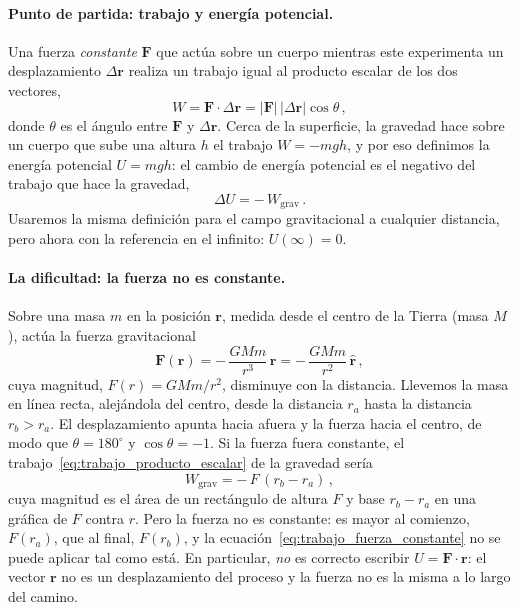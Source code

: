 \documentclass[11pt,a4paper]{book}
\begin{document}
\paragraph{Punto de partida: trabajo y energía potencial.}
Una fuerza \emph{constante} $\boldsymbol{F}$ que actúa sobre un cuerpo mientras
este experimenta un desplazamiento $\Delta\boldsymbol{r}$ realiza un trabajo
igual al producto escalar de los dos vectores,
\begin{equation}
  W = \boldsymbol{F}\cdot\Delta\boldsymbol{r}
    = \lvert\boldsymbol{F}\rvert\,\lvert\Delta\boldsymbol{r}\rvert\cos\theta \,,
  \label{eq:trabajo_producto_escalar}
\end{equation}
donde $\theta$ es el ángulo entre $\boldsymbol{F}$ y $\Delta\boldsymbol{r}$.
Cerca de la superficie, la gravedad hace sobre un cuerpo que sube una altura
$h$ el trabajo $W = -mgh$, y por eso definimos la energía potencial
$U = mgh$: el cambio de energía potencial es el negativo del trabajo que hace
la gravedad,
\begin{equation}
  \Delta U = -\,W_{\text{grav}} \,.
  \label{eq:def_cambio_epot}
\end{equation}
Usaremos la misma definición para el campo gravitacional a cualquier
distancia, pero ahora con la referencia en el infinito: $U(\infty) = 0$.

\paragraph{La dificultad: la fuerza no es constante.}
Sobre una masa $m$ en la posición $\boldsymbol{r}$, medida desde el centro de
la Tierra (masa $M$), actúa la fuerza gravitacional
\begin{equation}
  \boldsymbol{F}(\boldsymbol{r})
  = -\,\frac{GMm}{r^{3}}\,\boldsymbol{r}
  = -\,\frac{GMm}{r^{2}}\,\hat{\boldsymbol{r}} \,,
  \label{eq:fuerza_grav_epot}
\end{equation}
cuya magnitud, $F(r) = GMm/r^{2}$, disminuye con la distancia. Llevemos la
masa en línea recta, alejándola del centro, desde la distancia $r_{a}$ hasta
la distancia $r_{b} > r_{a}$. El desplazamiento apunta hacia afuera y la
fuerza hacia el centro, de modo que $\theta = 180^{\circ}$ y
$\cos\theta = -1$. Si la fuerza fuera constante, el
trabajo~\eqref{eq:trabajo_producto_escalar} de la gravedad sería
\begin{equation}
  W_{\text{grav}} = -\,F\,(r_{b} - r_{a}) \,,
  \label{eq:trabajo_fuerza_constante}
\end{equation}
cuya magnitud es el área de un rectángulo de altura $F$ y base
$r_{b} - r_{a}$ en una gráfica de $F$ contra $r$. Pero la fuerza no es
constante: es mayor al comienzo, $F(r_{a})$, que al final, $F(r_{b})$, y la
ecuación~\eqref{eq:trabajo_fuerza_constante} no se puede aplicar tal como
está. En particular, \emph{no} es correcto escribir
$U = \boldsymbol{F}\cdot\boldsymbol{r}$: el vector $\boldsymbol{r}$ no es un
desplazamiento del proceso y la fuerza no es la misma a lo largo del camino.
\end{document}
